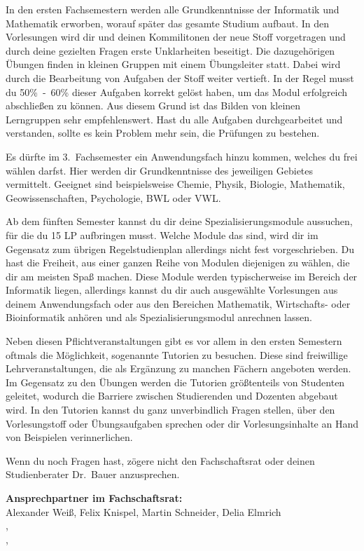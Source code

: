 In den ersten Fachsemestern werden alle Grundkenntnisse der Informatik und Mathematik erworben, worauf später das gesamte Studium aufbaut.
In den Vorlesungen wird dir und deinen Kommilitonen der neue Stoff vorgetragen und durch deine gezielten Fragen erste Unklarheiten beseitigt.
Die dazugehörigen Übungen finden in kleinen Gruppen mit einem Übungsleiter statt.
Dabei wird durch die Bearbeitung von Aufgaben der Stoff weiter vertieft.
In der Regel musst du 50\%~-~60\% dieser Aufgaben korrekt gelöst haben, um das Modul erfolgreich abschließen zu können.
Aus diesem Grund ist das Bilden von kleinen Lerngruppen sehr empfehlenswert.
Hast du alle Aufgaben durchgearbeitet und verstanden, sollte es kein Problem mehr sein, die Prüfungen zu bestehen.

Es dürfte im 3.~Fachsemester ein Anwendungsfach hinzu kommen, welches du frei wählen darfst.
Hier werden dir Grundkenntnisse des jeweiligen Gebietes vermittelt.
Geeignet sind beispielsweise Chemie, Physik, Biologie, Mathematik, Geowissenschaften, Psychologie, BWL oder VWL.

Ab dem fünften Semester kannst du dir deine Spezialisierungsmodule aussuchen, für die du 15 LP aufbringen musst.
Welche Module das sind, wird dir im Gegensatz zum übrigen Regelstudienplan allerdings nicht fest vorgeschrieben.
Du hast die Freiheit, aus einer ganzen Reihe von Modulen diejenigen zu wählen, die dir am meisten Spaß machen.
Diese Module werden typischerweise im Bereich der Informatik liegen, allerdings kannst du dir auch ausgewählte Vorlesungen aus deinem Anwendungsfach oder aus den Bereichen Mathematik, Wirtschafts- oder Bioinformatik anhören und als Spezialisierungsmodul anrechnen lassen.

Neben diesen Pflichtveranstaltungen gibt es vor allem in den ersten Semestern oftmals die Möglichkeit, sogenannte Tutorien zu besuchen.
Diese sind freiwillige Lehrveranstaltungen, die als Ergänzung zu manchen Fächern angeboten werden.
Im Gegensatz zu den Übungen werden die Tutorien größtenteils von Studenten geleitet, wodurch die Barriere zwischen Studierenden und Dozenten abgebaut wird.
In den Tutorien kannst du ganz unverbindlich Fragen stellen, über den Vorlesungstoff oder Übungsaufgaben sprechen oder dir Vorlesungsinhalte an Hand von Beispielen verinnerlichen.

Wenn du noch Fragen hast, zögere nicht den Fachschaftsrat oder deinen Studienberater Dr.~Bauer anzusprechen.

\textbf{Ansprechpartner im Fachschaftsrat:}\\
Alexander Weiß, Felix Knispel, Martin Schneider, Delia Elmrich \\
,\\
,\\
\\


